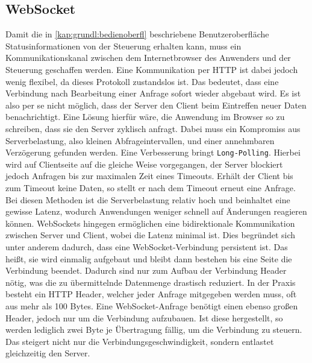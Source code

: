\subsection{WebSocket} \label{chp:grdlgn:webSocket}
Damit die in \ref{kap:grundl:bedienoberfl} beschriebene Benutzeroberfläche Statusinformationen von der Steuerung erhalten kann, muss ein Kommunikationskanal zwischen dem Internetbrowser des Anwenders und der Steuerung geschaffen werden. Eine Kommunikation per HTTP ist dabei jedoch wenig flexibel, da dieses Protokoll zustandslos ist. Das bedeutet, dass eine Verbindung nach Bearbeitung einer Anfrage sofort wieder abgebaut wird. Es ist also per se nicht möglich, dass der Server den Client beim Eintreffen neuer Daten benachrichtigt. Eine Lösung hierfür wäre, die Anwendung im Browser so zu schreiben, dass sie den Server zyklisch anfragt. Dabei muss ein Kompromiss aus Serverbelastung, also kleinen Abfrageintervallen, und einer annehmbaren Verzögerung gefunden werden. Eine Verbesserung bringt \texttt{Long-Polling}. Hierbei wird auf Clientseite auf die gleiche Weise vorgegangen, der Server blockiert jedoch Anfragen bis zur maximalen Zeit eines Timeouts. Erhält der Client bis zum Timeout keine Daten, so stellt er nach dem Timeout erneut eine Anfrage. Bei diesen Methoden ist die Serverbelastung relativ hoch und beinhaltet eine gewisse Latenz, wodurch Anwendungen weniger schnell auf Änderungen reagieren können. WebSockets\cite{BOOK:Websockets} hingegen ermöglichen eine bidirektionale Kommunikation zwischen Server und Client, wobei die Latenz minimal ist. Dies begründet sich unter anderem dadurch, dass eine WebSocket-Verbindung persistent ist. Das heißt, sie wird einmalig aufgebaut und bleibt dann bestehen bis eine Seite die Verbindung beendet. Dadurch sind nur zum Aufbau der Verbindung Header nötig, was die zu übermittelnde Datenmenge drastisch reduziert. In der Praxis besteht ein HTTP Header, welcher jeder Anfrage mitgegeben werden muss, oft aus mehr als 100 Bytes. Eine WebSocket-Anfrage benötigt einen ebenso großen Header, jedoch nur um die Verbindung aufzubauen. Ist diese hergestellt, so werden lediglich zwei Byte je Übertragung fällig, um die Verbindung zu steuern. Das steigert nicht nur die Verbindungsgeschwindigkeit, sondern entlastet gleichzeitig den Server.\cite{URL:WebSocketOrg}


